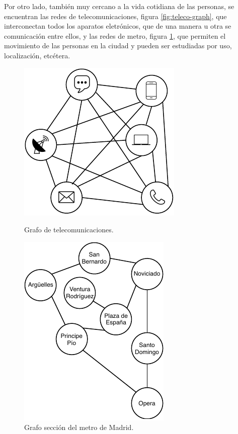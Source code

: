 Por otro lado, también muy cercano a la vida cotidiana de las personas, se encuentran las redes de telecomunicaciones, figura \ref{fig:teleco-graph}, que interconectan todos los aparatos eletrónicos, que de una manera u otra se comunicación entre ellos, y las redes de metro, figura \ref{fig:metro-graph}, que permiten el movimiento de las personas en la ciudad y pueden ser estudiadas por uso, localización, etcétera.

\begin{figure}[H]
	\begin{minipage}[b]{0.5\linewidth}
			\centering
			\includegraphics[scale=0.8]{Figures/teleco-graph.pdf}
			\caption{Grafo de telecomunicaciones.}
			\label{fig:teleco-graph}
	\end{minipage}
	\hspace{0.5cm}
	\begin{minipage}[b]{0.5\linewidth}
		\centering
		\includegraphics[scale=0.8]{Figures/metro-graph.pdf}
		\caption{Grafo sección del metro de Madrid.}
		\label{fig:metro-graph}
	\end{minipage}
\end{figure}

